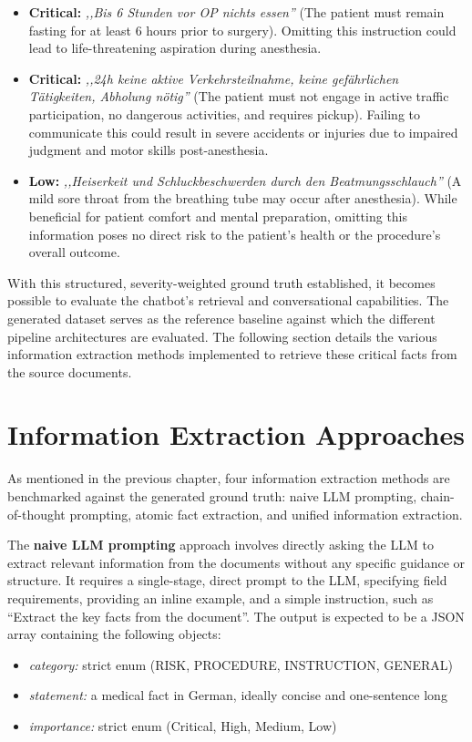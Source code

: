 \begin{itemize}
    \item \textbf{Critical:} \textit{,,Bis 6 Stunden vor OP nichts essen''} (The patient must remain fasting for at least 6 hours prior to surgery). Omitting this instruction could lead to life-threatening aspiration during anesthesia.
    \item \textbf{Critical:} \textit{,,24h keine aktive Verkehrsteilnahme, keine gefährlichen Tätigkeiten, Abholung nötig''} (The patient must not engage in active traffic participation, no dangerous activities, and requires pickup). Failing to communicate this could result in severe accidents or injuries due to impaired judgment and motor skills post-anesthesia.
    \item \textbf{Low:} \textit{,,Heiserkeit und Schluckbeschwerden durch den Beatmungsschlauch''} (A mild sore throat from the breathing tube may occur after anesthesia). While beneficial for patient comfort and mental preparation, omitting this information poses no direct risk to the patient's health or the procedure's overall outcome.
\end{itemize} 

With this structured, severity-weighted ground truth established, it becomes possible to evaluate the chatbot's retrieval and conversational capabilities. 
The generated dataset serves as the reference baseline against which the different pipeline architectures are evaluated. 
The following section details the various information extraction methods implemented to retrieve these critical facts from the source documents.

\section{Information Extraction Approaches}

As mentioned in the previous chapter, four information extraction methods are benchmarked against the generated ground truth: naive LLM prompting, chain-of-thought prompting, atomic fact extraction, and unified information extraction.

The \textbf{naive LLM prompting} approach involves directly asking the LLM to extract relevant information from the documents without any specific guidance or structure. 
It requires a single-stage, direct prompt to the LLM, specifying field requirements, providing an inline example, and a simple instruction, such as ``Extract the key facts from the document''.
The output is expected to be a JSON array containing the following objects: 
\begin{itemize}
    \item \textit{category:} strict enum (RISK, PROCEDURE, INSTRUCTION, GENERAL)
    \item \textit{statement:} a medical fact in German, ideally concise and one-sentence long
    \item \textit{importance:} strict enum (Critical, High, Medium, Low)
\end{itemize}

